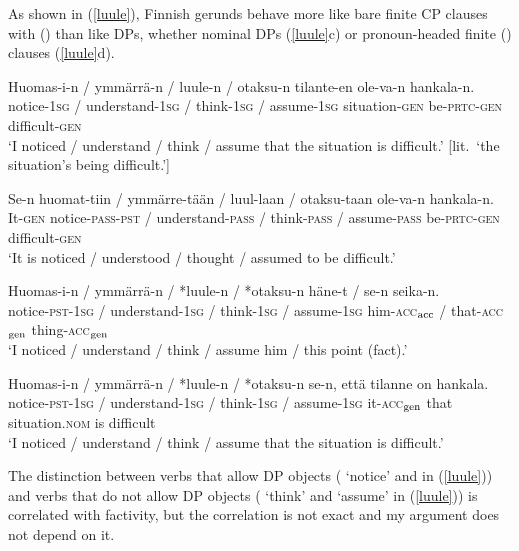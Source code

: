 \documentclass[output=paper,
modfonts
]{LSP/langsci}
\newcommand{\rf}[1]{(\ref{#1})}
\newcommand{\rfa}[2]{(\ref{#1}{#2})}
\def\trf#1{$_{\textrm{\scriptsize{#1}}}$}
\begin{document}
As shown in \rf{luule}, Finnish gerunds behave more like bare finite CP clauses with 
() than like DPs, whether nominal DPs \rfa{luule}{c} or
pronoun-headed finite  () clauses  \rfa{luule}{d}.
\begin{exe}
\ex\label{luule}
	\ea	\gll Huomas-i-n / ymmärrä-n / luule-n / otaksu-n tilante-en ole-va-n hankala-n. \\
		  notice-\textsc{1sg} / understand-\textsc{1sg} / think-\textsc{1sg} / assume-\textsc{1sg}
		  situation-\textsc{gen} be-\textsc{prtc}-\textsc{gen} difficult-\textsc{gen}\\ 
 		\glt `I noticed / understand / think / assume that the situation is difficult.' [lit.\ `the
		  situation's being difficult.'] 

	\ex \gll Se-n huomat-tiin / ymmärre-tään / luul-laan / otaksu-taan ole-va-n hankala-n.\\
		  It-\textsc{gen} notice-\textsc{pass}-\textsc{pst} / understand-\textsc{pass} / think-\textsc{pass} /
		  assume-\textsc{pass} be-\textsc{prtc}-\textsc{gen} difficult-\textsc{gen}\\ 
		\glt  `It is noticed / understood / thought / assumed to be difficult.'

	\ex \gll Huomas-i-n / ymmärrä-n / *luule-n / *otaksu-n häne-t / se-n seika-n. \\
		notice-\textsc{pst}-\textsc{1sg} / understand-\textsc{1sg} / think-\textsc{1sg} / assume-\textsc{1sg}
		him-\textsc{acc\trf{acc}} / that-\textsc{acc\trf{gen}} thing-\textsc{acc\trf{gen}}\\ 
		\glt `I noticed / understand / think / assume him / this point (fact).'

	\ex \gll Huomas-i-n / ymmärrä-n / *luule-n / *otaksu-n se-n, että tilanne on hankala. \\
		notice-\textsc{pst}-\textsc{1sg}  / understand-\textsc{1sg} / think-\textsc{1sg} / assume-\textsc{1sg}
		it-\textsc{acc\trf{gen}} that situation.\textsc{nom} is difficult\\ 
		\glt `I noticed / understand / think / assume that the situation is difficult.'
	\z    
\end{exe}
The distinction between verbs that allow DP objects ( `notice' and
 in \rf{luule}) and verbs that do not allow DP objects (
`think' and  `assume' in \rf{luule}) is correlated with factivity, but the
correlation is not exact and my argument does not depend on it.
\end{document}
